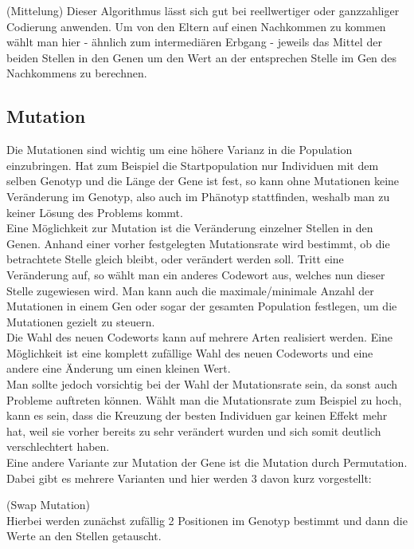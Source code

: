 \begin{algo}(Mittelung)
	Dieser Algorithmus lässt sich gut bei reellwertiger oder ganzzahliger Codierung anwenden. Um von den Eltern auf einen Nachkommen zu kommen wählt man hier - ähnlich zum intermediären Erbgang - jeweils das Mittel der beiden Stellen in den Genen um den Wert an der entsprechen Stelle im Gen des Nachkommens zu berechnen.
\end{algo}

\subsection{Mutation}
Die Mutationen sind wichtig um eine höhere Varianz in die Population einzubringen. Hat zum Beispiel die Startpopulation nur Individuen mit dem selben Genotyp und die Länge der Gene ist fest, so kann ohne Mutationen keine Veränderung im Genotyp, also auch im Phänotyp stattfinden, weshalb man zu keiner Lösung des Problems kommt.\\
Eine Möglichkeit zur Mutation ist die Veränderung einzelner Stellen in den Genen.  Anhand einer vorher festgelegten Mutationsrate wird bestimmt, ob die betrachtete Stelle gleich bleibt, oder verändert werden soll. Tritt eine Veränderung auf, so wählt man ein anderes Codewort aus, welches nun dieser Stelle zugewiesen wird. Man kann auch die maximale/minimale Anzahl der Mutationen in einem Gen oder sogar der gesamten Population festlegen, um die Mutationen gezielt zu steuern.\\
Die Wahl des neuen Codeworts kann auf mehrere Arten realisiert werden. Eine Möglichkeit ist eine komplett zufällige Wahl des neuen Codeworts und eine andere eine Änderung um einen kleinen Wert.\\
Man sollte jedoch vorsichtig bei der Wahl der Mutationsrate sein, da sonst auch Probleme auftreten können. Wählt man die Mutationsrate zum Beispiel zu hoch, kann es sein, dass die Kreuzung der besten Individuen gar keinen Effekt mehr hat, weil sie vorher bereits zu sehr verändert wurden und sich somit deutlich verschlechtert haben.\\
Eine andere Variante zur Mutation der Gene ist die Mutation durch Permutation. Dabei gibt es mehrere Varianten und hier werden 3 davon kurz vorgestellt:
\setcounter{algo}{0}
\begin{algo}(Swap Mutation)\\
	Hierbei werden zunächst zufällig 2 Positionen im Genotyp bestimmt und dann die Werte an den Stellen getauscht.
\end{algo}
